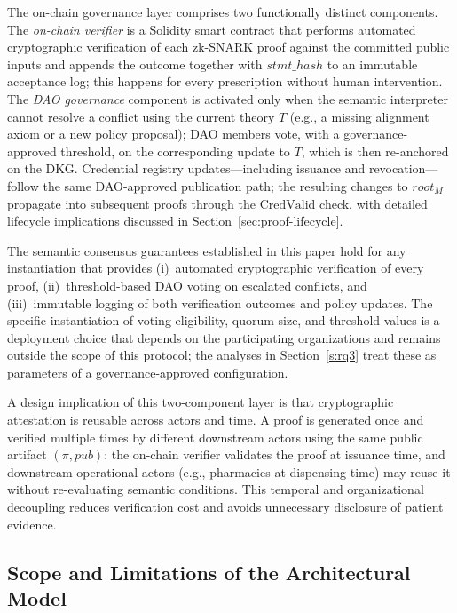 \documentclass[journal]{IEEEtran}
\begin{document}
The on-chain governance layer comprises two functionally distinct components. The \emph{on-chain verifier} is a Solidity smart contract that performs automated cryptographic verification of each zk-SNARK proof against the committed public inputs and appends the outcome together with $\mathit{stmt\_hash}$ to an immutable acceptance log; this happens for every prescription without human intervention. The \emph{DAO governance} component is activated only when the semantic interpreter cannot resolve a conflict using the current theory $T$ (e.g., a missing alignment axiom or a new policy proposal); DAO members vote, with a governance-approved threshold, on the corresponding update to $T$, which is then re-anchored on the DKG. Credential registry updates---including issuance and revocation---follow the same DAO-approved publication path; the resulting changes to $\mathit{root}_M$ propagate into subsequent proofs through the $\mathrm{CredValid}$ check, with detailed lifecycle implications discussed in Section~\ref{sec:proof-lifecycle}.

The semantic consensus guarantees established in this paper hold for any instantiation that provides (i)~automated cryptographic verification of every proof, (ii)~threshold-based DAO voting on escalated conflicts, and (iii)~immutable logging of both verification outcomes and policy updates. The specific instantiation of voting eligibility, quorum size, and threshold values is a deployment choice that depends on the participating organizations and remains outside the scope of this protocol; the analyses in Section~\ref{s:rq3} treat these as parameters of a governance-approved configuration.

A design implication of this two-component layer is that cryptographic attestation is reusable across actors and time. A proof is generated once and verified multiple times by different downstream actors using the same public artifact $(\pi, \mathit{pub})$: the on-chain verifier validates the proof at issuance time, and downstream operational actors (e.g., pharmacies at dispensing time) may reuse it without re-evaluating semantic conditions. This temporal and organizational decoupling reduces verification cost and avoids unnecessary disclosure of patient evidence.

\subsection{Scope and Limitations of the Architectural Model}
\label{ss:scope-and-limit}
\end{document}
